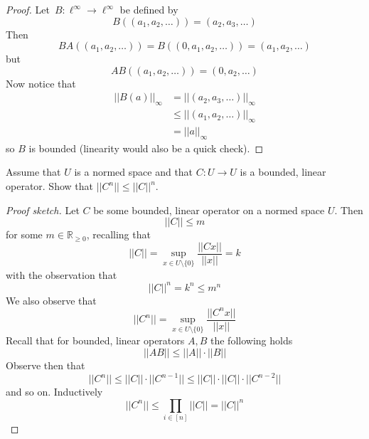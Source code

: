 \begin{proof}
    Let $B : \ell^\infty \to \ell^\infty$ be defined by 
    \[
        B((a_1,a_2,\ldots)) = (a_2,a_3,\ldots)
    \]
    Then 
    \[
        BA((a_1,a_2,\ldots)) = B((0,a_1,a_2,\ldots)) 
        = (a_1,a_2,\ldots)
    \]
    but 
    \[
        AB((a_1,a_2,\ldots)) = (0,a_2,\ldots)
    \]
    Now notice that 
    \begin{align*}
        ||B(a)||_\infty &= ||(a_2,a_3,\ldots)||_\infty \\ 
                        &\leq ||(a_1,a_2,\ldots)||_\infty \\ 
                        &= ||a||_\infty
    \end{align*}
    so $B$ is bounded (linearity would also be a quick check).
\end{proof}

\begin{prob}
    Assume that $U$ is a normed space and that $C : U \to U$ 
    is a bounded, linear operator. Show that $||C^n|| \leq ||C||^n$.
\end{prob}
\begin{proof}[Proof sketch]
    Let $C$ be some bounded, linear operator on a normed space $U$. 
    Then 
    \[
        ||C|| \leq m
    \]
    for some $m \in \mathbb R_{\geq 0}$, recalling that 
    \[
        ||C|| = \sup_{x \in U\setminus \{0\}}\frac{||Cx||}{||x||}
        = k
    \]
    with the observation that 
    \[
        ||C||^n = k^n \leq m^n
    \]
    We also observe that 
    \[
        ||C^n|| = \sup_{x \in U\setminus\{0\}}
        \frac{||C^nx||}{||x||}
    \]
    Recall that for bounded, linear operators $A,B$ the following 
    holds 
    \[
        ||AB|| \leq ||A||\cdot||B||
    \]
    Observe then that 
    \[
        ||C^n|| \leq ||C||\cdot||C^{n-1}|| \leq 
        ||C||\cdot||C||\cdot||C^{n-2}||
    \]
    and so on. Inductively 
    \[
        ||C^n|| \leq \prod_{i \in [n]}||C|| = ||C||^n
    \]
\end{proof}

